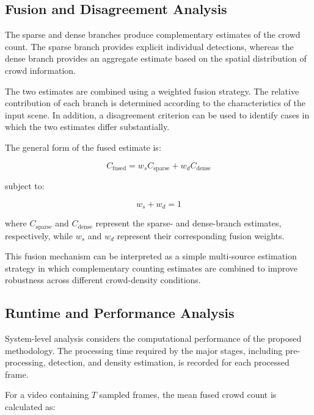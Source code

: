 \documentclass[12pt,a4paper]{report}
\begin{document}
\subsection{Fusion and Disagreement Analysis}

The sparse and dense branches produce complementary estimates of the crowd
count. The sparse branch provides explicit individual detections, whereas
the dense branch provides an aggregate estimate based on the spatial
distribution of crowd information.

The two estimates are combined using a weighted fusion strategy. The
relative contribution of each branch is determined according to the
characteristics of the input scene. In addition, a disagreement criterion
can be used to identify cases in which the two estimates differ
substantially.

The general form of the fused estimate is:

\begin{equation}
C_{\mathrm{fused}}
=
w_s C_{\mathrm{sparse}}
+
w_d C_{\mathrm{dense}}
\label{eq:fused-count}
\end{equation}

subject to:

\begin{equation}
w_s+w_d=1
\label{eq:fusion-weights}
\end{equation}

where $C_{\mathrm{sparse}}$ and $C_{\mathrm{dense}}$ represent the
sparse- and dense-branch estimates, respectively, while $w_s$ and $w_d$
represent their corresponding fusion weights.

This fusion mechanism can be interpreted as a simple multi-source
estimation strategy in which complementary counting estimates are combined
to improve robustness across different crowd-density conditions.


\subsection{Runtime and Performance Analysis}

System-level analysis considers the computational performance of the
proposed methodology. The processing time required by the major stages,
including pre-processing, detection, and density estimation, is recorded
for each processed frame.

For a video containing $T$ sampled frames, the mean fused crowd count is
calculated as:
\end{document}
